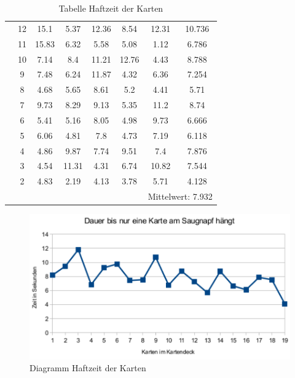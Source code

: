 \begin{enumerate}
\begin{table}[H]
{\begin{tabular}{|c|c|c|c|c|c|c|c|}
            & 12 & 15.1         & 5.37         & 12.36        & 8.54         & 12.31               & 10.736           \\ \cline{2-8}
            & 11 & 15.83        & 6.32         & 5.58         & 5.08         & 1.12                & 6.786            \\ \cline{2-8}
            & 10 & 7.14         & 8.4          & 11.21        & 12.76        & 4.43                & 8.788            \\ \cline{2-8}
            & 9  & 7.48         & 6.24         & 11.87        & 4.32         & 6.36                & 7.254            \\ \cline{2-8}
            & 8  & 4.68         & 5.65         & 8.61         & 5.2          & 4.41                & 5.71             \\ \cline{2-8}
            & 7  & 9.73         & 8.29         & 9.13         & 5.35         & 11.2                & 8.74             \\ \cline{2-8}
            & 6  & 5.41         & 5.16         & 8.05         & 4.98         & 9.73                & 6.666            \\ \cline{2-8}
            & 5  & 6.06         & 4.81         & 7.8          & 4.73         & 7.19                & 6.118            \\ \cline{2-8}
            & 4  & 4.86         & 9.87         & 7.74         & 9.51         & 7.4                 & 7.876            \\ \cline{2-8}
            & 3  & 4.54         & 11.31        & 4.31         & 6.74         & 10.82               & 7.544            \\ \cline{2-8}
            & 2  & 4.83         & 2.19         & 4.13         & 3.78         & 5.71                & 4.128            \\ \cline{2-8}
            &    &              &              &              &              & \multicolumn{2}{c|}{Mittelwert: 7.932} \\ \hline
        \end{tabular}}
        \caption{Tabelle Haftzeit der Karten}
        \label{tab:my-table}
    \end{table}

    \begin{figure}[H]
        \centering
        \includegraphics[scale=1,page=1]{fig/mech/Haftzeit}
        \caption{Diagramm Haftzeit der Karten}
    \end{figure}


\end{enumerate}
